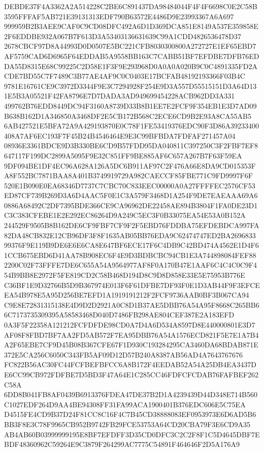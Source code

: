 \documentclass[UTF8,fontset=fandol,zihao=-4,a4paper]{ctexart}
\begin{document}
{{DEBDE37F4A3362A2A514228C2BE6C891437DA98484044F4F4F6698C0E2C58B3595FFFAF5AB721E39131313EDF790B63572E4486D9E23993367A6A697
999959B2B3AEE9CAF0C9CD08DFC492A6D1D369DCA851E8149A537E359858E2F6EDDBE932A067B7F613D3A53403136631639C99A1CDD4826536478D37
2678CBCF97D8A44993D0D0507E5BC221CFB8030300800A272727E1EF65EBD7AF5759CAD6D6965F64EDDAB5A9558BB163C7CABB51BF7EFDBE7DFB76ED
DA55D8315E68C99225C2D58E1F3F9E293968D0A0A0A020B9C0C4891335FD2ACDE7BD55C7F7489C3B77AE4AF9C0C0403E17BCFAB48192193366F03B4C
9781E16761CE9C3972D3344F9E3C7294928F254E9D3A557D55515151D3A64D131E5B3A05521F42FA8796E7D7DADA3AD949699454228ACB962DD3A331
499762B76EDD8449DC94F3160A8739D33B8B1EE7E2FCF9F354EB1E3D7AD09B638B162D1A346850A3468DF2E5CB172B568C2ECE6CD9B2E93A8CA55AB5
6AB427521E5BFA72A9A429193870E0C78F1FE53419376EDC90F3D86A39233400408A7AF6EC193F7F45B24B4546464E9E3C99BFBDA7FDFAF271457A04
08936E3361BDCE9D3B330BE6CD9B57FDD95DA040811C397250C3F2FBF7EF8647117F199DC2899A5095F9E32C851FF9BE885AF6C657A267B7F63F59EA
9DF094BE1DF4EC96A628A126A5DC6B911AF97C2F476A66E8DA9CD015353FA8F552BC7871BAA8A401B3749919729A982CAECCF85FBE771C9FD9997F6F
520E1B090E0EA68346D7737C7CBC70C833EEC00000A0A27FFFFEC2576CF53ED87CF739B269D3A6D4AAC5F0E1C3A579F3468D1A254F9DE7EAEAAA69A6
0886A68492C2DF7395BDE366CE9CA96962DE22458AE894B3804F1FA0DE23D1C3C383CFEBE1E2E292EC86264D9A249C5EC3F0B33075EA54E53A0B152A
244529F9505B8B162DE6CF9FBF7CF9F2F5EBD76FDDBA75EFDEBDCA997FA82DA48CB832E12CB96DF3F8F1635AB05BB76EDA9C62474747ED2BA2696833
99376F9E119B9DE6E6E6CA8E647BF6ECE17F6C4DB9C42BD474A4562E1D4F61CCB675EBD6D41AA78B908EC6F4E9D3BDBCBC94CB1E3A744898084FEF88
2200C02F73FFFE7DE6C655A54A9564977AF8F0A170B47E1AAF6C4C4C0C9F454B9BB8E2972F5FE819CD2C58B468D194D8C9D8D858E33E5E75953B776E
C36BF1E9D32766B5D9B367974E013F6F61DFBE7DF93F0E1D3AB44F9F3EFCEEA54B978E5A95D256BE7EFD1A1919191212F2FCF9736AAB0BF3B067CA94
C9E8E72831315138E4D9D2D2921A0C8D1B37AE5DBB76A54A95F8668C265BB66C7173735309395A58583468D040D7486FB298AE804CEF387E2A183EFD
0A3F5F22358A121212FCFDFDE98CD0A7D4A6D534A8597D8E440000801E3D7AF08F8FBD7BF7AA2FD5AB572F7EA95DBB76A54A1576ECD821F5E7E1A7B4
A2F65EBE7CF9D45B08B367CFE67F1D930C193284295CA3460DA68BDAB871E372E5CA256C6050C343FB5AF09D12D57B240A8387AB56AD4A7643767676
FC822B56AC30FC44FCFBEFBFCC6A8B172F4EEDAB52A54A25DB4EA3437DE6CC99CB972FDFBE7D5BD3F47A64E1C285CC46FDFCFCDAB76FAFBEF262C58A
6DD8B041FB8AF0439B6913376FDEA47DE37B2D1A4239439D44D348E714B560C1027EDF264D9AA4BE94308FF31FA99ACA1900401B376EDC606E5C75EA
D4515FE4CD9B37D24F81CC8C16F4C7B45CD38888083EF0953973E6D6AD5B6BB3F8E3C78F9965CB952B9742FB29FCE53753A64CD20CBA79F3E6CD9A35
AB4AB60B03999999195E8BF7EFDFF3D35CD0DFC3C2C2F8F1C5D4645DBF7EBDF48360962C59264E9C3879F264299AC7775C54891F464646F2D5A176A9
}}
\end{document}
